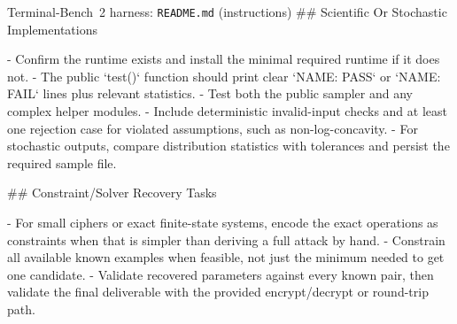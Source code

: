 \documentclass{llmxive}
\begin{document}
\begin{promptbox}{Terminal-Bench~2 harness: \texttt{README.md} (instructions)}
## Scientific Or Stochastic Implementations

- Confirm the runtime exists and install the minimal required runtime if it does not.
- The public `test()` function should print clear `NAME: PASS` or `NAME: FAIL` lines plus relevant statistics.
- Test both the public sampler and any complex helper modules.
- Include deterministic invalid-input checks and at least one rejection case for violated assumptions, such as non-log-concavity.
- For stochastic outputs, compare distribution statistics with tolerances and persist the required sample file.

## Constraint/Solver Recovery Tasks

- For small ciphers or exact finite-state systems, encode the exact operations as constraints when that is simpler than deriving a full attack by hand.
- Constrain all available known examples when feasible, not just the minimum needed to get one candidate.
- Validate recovered parameters against every known pair, then validate the final deliverable with the provided encrypt/decrypt or round-trip path.
\end{promptbox}
\end{document}
